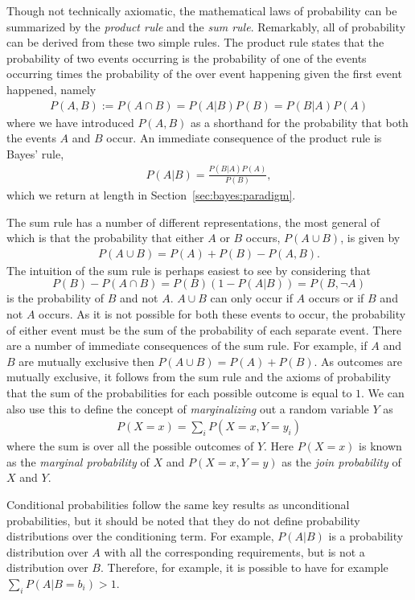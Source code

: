 Though not technically axiomatic, the mathematical laws of probability can be summarized by the \emph{product rule}
and the \emph{sum rule}.  Remarkably, all of probability can be derived from these two simple rules.
The product rule states that the probability of two events occurring is the probability of one of the events
occurring times the probability of the over event happening given the first event happened, namely
\begin{align}
\label{eq:prob:prod}
P(A,B) := P(A \cap B) = P(A|B) P(B) =  P(B|A) P(A)
\end{align}
where we have introduced $P(A,B)$ as a shorthand for the probability that both the events $A$ and $B$ occur.
An immediate consequence of the product rule is Bayes' rule,
\begin{align}
P(A|B) = \frac{P(B|A)P(A)}{P(B)},
\end{align}
which we return at length in Section~\ref{sec:bayes:paradigm}.

The sum rule has a number of different representations, the most general of which is that 
the probability that either $A$ or $B$ occurs, $P(A\cup B)$, is given by
\begin{align}
\label{eq:prob:sum}
P(A\cup B) = P(A) + P(B) - P(A, B).
\end{align}
The intuition of the sum rule is perhaps easiest to see by considering that
\[
P(B) - P(A \cap B) = P(B)(1-P(A|B)) = P(B, \neg A)
\]
 is the probability of $B$ and 
not $A$.  $A\cup B$ can only occur if $A$ occurs or if $B$ and not $A$ occurs.  As it is not
possible for both these events to occur, the probability of either event must be the sum of the
probability of each separate event.
There are a number of immediate consequences of the sum rule.  For example, if $A$ and $B$ are
mutually exclusive then $P(A\cup B) = P(A) + P(B)$.  As outcomes are mutually exclusive, it
follows from the sum rule and the axioms of probability that the sum of the probabilities
for each possible outcome is equal to $1$.  We can also use this to
define the concept of \emph{marginalizing} out a random variable $Y$ as
\begin{align}
\label{eq:prob:marginal}
P(X=x) = \sum_{i} P(X=x,Y=y_i)
\end{align}
where the sum is over all the possible outcomes of $Y$.  Here $P(X=x)$ is known as the
\emph{marginal probability} of $X$ and $P(X=x,Y=y)$ as the \emph{join probability} of $X$
and $Y$.

Conditional probabilities follow  the same key results as unconditional probabilities, but it 
should be noted that they do not define probability distributions over the conditioning term.  
For example, $P(A|B)$ is a probability distribution over $A$ with all the corresponding 
requirements, but is not a distribution over $B$.  Therefore,
for example, it is possible to have for example $\sum_{i} P(A|B=b_i) >1$.

